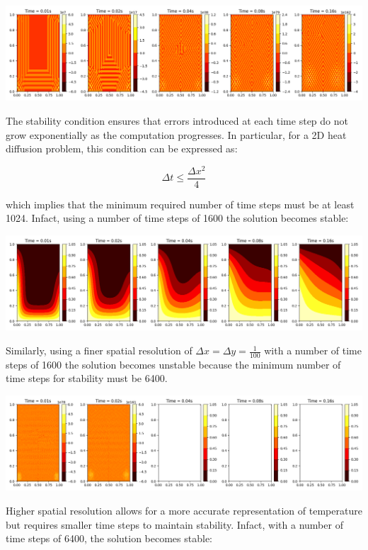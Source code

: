 \documentclass{article}
\begin{document}
\includegraphics[width=\textwidth]{Figure_1.png}\par\vspace{1cm}

The stability condition ensures that errors introduced at each time step do not grow exponentially as
the computation progresses. In particular, for a 2D heat diffusion problem, this condition can be expressed as:

\[
\Delta t \leq \frac{\Delta x^2}{4}
\]

which implies that the minimum required number of time steps must be at least 1024. 
Infact, using a number of time steps of 1600 the solution becomes stable:

\includegraphics[width=\textwidth]{Figure_2.png}\par\vspace{1cm}

Similarly, using a finer spatial resolution of \( \Delta x = \Delta y = \frac{1}{100} \) with a number of
time steps of 1600 the solution becomes unstable because the minimum number of time steps for stability must be 6400.

\includegraphics[width=\textwidth]{Figure_3.png}\par\vspace{1cm}

Higher spatial resolution allows for a more accurate representation of temperature but requires smaller
time steps to maintain stability. Infact, with a number of time steps of 6400, the solution becomes stable:
\end{document}
